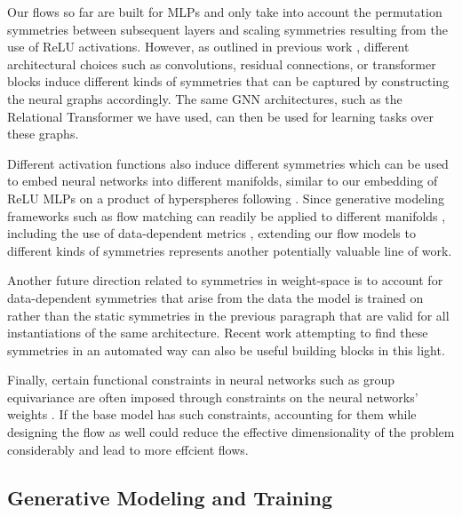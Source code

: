 Our flows so far are built for MLPs and only take into account the permutation symmetries between subsequent layers and scaling symmetries resulting from the use of ReLU activations. However, as outlined in previous work \citep{kofinasGraphNeuralNetworks2024,limGraphMetanetworksProcessing2023}, different architectural choices such as convolutions, residual connections, or transformer blocks induce different kinds of symmetries that can be captured by constructing the neural graphs accordingly. The same GNN architectures, such as the Relational Transformer we have used, can then be used for learning tasks over these graphs. 

Different activation functions also induce different symmetries \citep{godfreySymmetriesDeepLearning2022} which can be used to embed neural networks into different manifolds, similar to our embedding of ReLU MLPs on a product of hyperspheres following \citep{pittorinoDeepNetworksToroids2022}. Since generative modeling frameworks such as flow matching can readily be applied to different manifolds \citep{chenRiemannianFlowMatching2023}, including the use of data-dependent metrics \citep{kapusniakMetricFlowMatching2024}, extending our flow models to different kinds of symmetries represents another potentially valuable line of work. 

Another future direction related to symmetries in weight-space is to account for data-dependent symmetries \citep{zhaoSymmetriesFlatMinima2023} that arise from the data the model is trained on rather than the static symmetries in the previous paragraph that are valid for all instantiations of the same architecture. Recent work attempting to find these symmetries in an automated way \citep{zhaoFindingSymmetryNeural2024} can also be useful building blocks in this light. 

Finally, certain functional constraints in neural networks such as group equivariance are often imposed through constraints on the neural networks' weights \citep{weilerEquivariantCoordinateIndependent2023}. If the base model has such constraints, accounting for them while designing the flow as well could reduce the effective dimensionality of the problem considerably and lead to more effcient flows. 

\subsection{Generative Modeling and Training}

